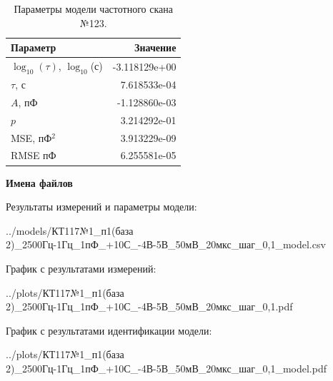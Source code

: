 \begin{table}[!ht]
    \centering
    \caption{Параметры модели частотного скана №123.}
    \begin{tabular}{|l|r|}
        \hline
        Параметр                                       & Значение                  \\ \hline
        $\log_{10}(\tau)$, $\log_{10}$(с)              & -3.118129e+00             \\ \hline
        $\tau$, с                                      & 7.618533e-04              \\ \hline
        $A$, пФ                                        & -1.128860e-03             \\ \hline
        $p$                                            & 3.214292e-01              \\ \hline
        MSE, пФ$^2$                                    & 3.913229e-09              \\ \hline
        RMSE пФ                                        & 6.255581e-05              \\ \hline
    \end{tabular}
    \label{table:frequency_scan_model_123}
\end{table}

\textbf{Имена файлов}

Результаты измерений и параметры модели:

\scriptsize../models/КТ117№1\_п1(база 2)\_2500Гц-1Гц\_1пФ\_+10С\_-4В-5В\_50мВ\_20мкс\_шаг\_0,1\_model.csv
\normalsize

График с результатами измерений:

\scriptsize../plots/КТ117№1\_п1(база 2)\_2500Гц-1Гц\_1пФ\_+10С\_-4В-5В\_50мВ\_20мкс\_шаг\_0,1.pdf
\normalsize

График с результатами идентификации модели:

\scriptsize../plots/КТ117№1\_п1(база 2)\_2500Гц-1Гц\_1пФ\_+10С\_-4В-5В\_50мВ\_20мкс\_шаг\_0,1\_model.pdf
\normalsize

